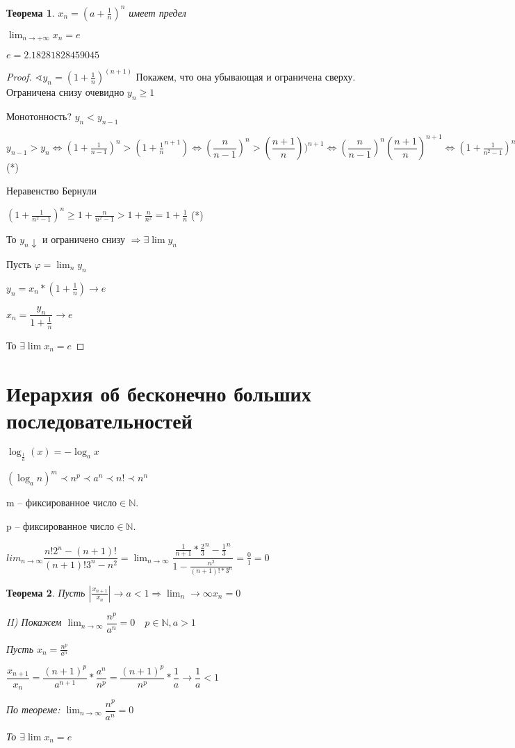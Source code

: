 \documentclass{book}
\newtheorem{Th}{Теорема}[chapter]
\begin{document}
\begin{Th}
	$x_n = (a + \frac{1}{n})^n$ имеет предел
	
	$\lim_{n\to +\infty}x_n = e$	
	
	$e = 2.18281828459045$
\end{Th}

\begin{proof}
	$\sphericalangle y_n = (1+\frac{1}{n})^(n+1)$ Покажем, что она убывающая и ограничена сверху. Ограничена снизу очевидно $y_n\geqslant1$
	
	Монотонность? $y_n<y_{n-1}$
	
	$y_{n-1}>y_n \Longleftrightarrow (1+\frac{1}{n-1})^n>(1+\frac{1}{n}^{n+1})\Longleftrightarrow (\dfrac{n}{n-1})^n>(\dfrac{n+1}{n}))^{n+1}\Longleftrightarrow (\dfrac{n}{n-1})^n(\dfrac{n+1}{n})^{n+1} \Longleftrightarrow (1+\frac{1}{n^2-1})^n(\frac{n}{n+1})>1 \Longleftrightarrow (1+\frac{1}{n^2-1})^n>\frac{n+1}{n}=1+\frac{1}{n}$ (*)
	
	Неравенство Бернули
	
	$(1+\frac{1}{n^2-1})^n\geqslant1+\frac{n}{n^2-1}>1+\frac{n}{n^2}=1+\frac{1}{n}$	(*)
	
	То $y_n\downarrow$ и ограничено снизу $\Rightarrow \exists \lim y_n$
	
	Пусть $\varphi = \lim_n y_n$
	
	$y_n = x_n*(1+\frac{1}{n}) \to e$
	
	$x_n = \dfrac{y_n}{1+\frac{1}{n}} \to e$
	
	То $\exists \lim x_n = e$
\end{proof}

\section*{Иерархия об бесконечно больших последовательностей}

$\log_{\frac{1}{a}}(x) = - \log_{a}x$

$(\log_a n )^m\prec n^p \prec a^n \prec n! \prec n^n$

m -- фиксированное число$\in \mathds{N}$.

p -- фиксированное число$\in \mathds{N}$.
	
$lim_{n\to \infty}\dfrac{n!2^n-(n+1)!}{(n+1)!3^n-n^2} = \lim_{n\to\infty}\dfrac{\frac{1}{n+1}*\frac{2}{3}^n - \frac{1}{3}^n}{1-\frac{n^2}{(n+1)! * 3^n}} = \frac{0}{1} = 0$

\begin{Th}
	Пусть $|\frac{x_{n+1}}{x_n}| \to a<1 \Rightarrow \lim_{n} \to\infty x_n = 0$
	
	II) Покажем $\lim_{n\to \infty}\dfrac{n^p}{a^n} = 0\quad p \in \mathds{N}, a>1$
	
	Пусть $x_n = \frac{n^p}{a^n}$
	
	$\dfrac{x_{n+1}}{x_n} = \dfrac{(n+1)^p}{a^{n+1}} * \dfrac{a^n}{n^p} = \dfrac{(n+1)^p}{n^p} * \dfrac{1}{a} \to \dfrac{1}{a}<1$
	
	По теореме: $\lim_{n\to \infty}\dfrac{n^p}{a^n} = 0$
	
	То $\exists \lim x_n = e$
\end{Th}
\end{document}
